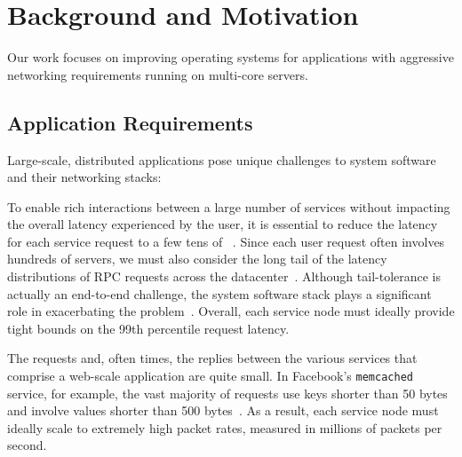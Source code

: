 
\section{Background and Motivation}
\label{sec:motivation}

Our work focuses on improving operating systems for applications with
aggressive networking requirements running on multi-core servers.

\subsection{Application Requirements}
\label{sec:motivation:challenges}


Large-scale, distributed applications pose unique challenges to system
software and their networking stacks:

 To enable rich interactions
between a large number of services without impacting the overall
latency experienced by the user, it is essential to reduce the latency
for each service request to a few tens of
\microsecond~\cite{luiz-isscc,DBLP:conf/hotos/RumbleOSRO11}.  Since
each user request often involves hundreds of servers, we must also
consider the long tail of the latency distributions of RPC requests
across the datacenter~\cite{DBLP:journals/cacm/DeanB13}. Although
tail-tolerance is actually an end-to-end challenge, the system
software stack plays a significant role in exacerbating the
problem~\cite{DBLP:conf/eurosys/LeverichK14}. Overall, each service
node must ideally provide tight bounds on the 99th percentile request
latency.

 The requests and, often times, the
replies between the various services that comprise a web-scale
application are quite small. In Facebook's \texttt{memcached} service,
for example, the vast majority of requests use keys shorter than 50
bytes and involve values shorter than 500
bytes~\cite{Atikoglu:2012:WAL}. As a result, each service node must
ideally scale to extremely high packet rates, measured in millions of
packets per second. 

